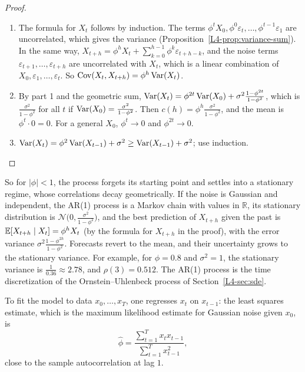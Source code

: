 \begin{proof}
    \begin{enumerate}
        \item The formula for $X_t$ follows by induction. The terms $\phi^tX_0, \phi^0\varepsilon_t, \ldots, \phi^{t-1}\varepsilon_1$ are uncorrelated, which gives the variance (Proposition~\ref{L4-prop:variance-sum}). In the same way, $X_{t+h} = \phi^hX_t + \sum_{k=0}^{h-1}\phi^k\varepsilon_{t+h-k}$, and the noise terms $\varepsilon_{t+1}, \ldots, \varepsilon_{t+h}$ are uncorrelated with $X_t$, which is a linear combination of $X_0, \varepsilon_1, \ldots, \varepsilon_t$. So $\operatorname{Cov}(X_t, X_{t+h}) = \phi^h\operatorname{Var}(X_t)$.
        \item By part 1 and the geometric sum, $\operatorname{Var}(X_t) = \phi^{2t}\operatorname{Var}(X_0) + \sigma^2\frac{1 - \phi^{2t}}{1 - \phi^2}$, which is $\frac{\sigma^2}{1 - \phi^2}$ for all $t$ if $\operatorname{Var}(X_0) = \frac{\sigma^2}{1 - \phi^2}$. Then $c(h) = \phi^h\frac{\sigma^2}{1 - \phi^2}$, and the mean is $\phi^t \cdot 0 = 0$. For a general $X_0$, $\phi^t \to 0$ and $\phi^{2t} \to 0$.
        \item $\operatorname{Var}(X_t) = \phi^2\operatorname{Var}(X_{t-1}) + \sigma^2 \geq \operatorname{Var}(X_{t-1}) + \sigma^2$; use induction. \qedhere
    \end{enumerate}
\end{proof}

So for $|\phi| < 1$, the process forgets its starting point and settles into a stationary regime, whose correlations decay geometrically. If the noise is Gaussian and independent, the AR(1) process is a Markov chain with values in $\mathbb{R}$, its stationary distribution is $\mathcal{N}\big(0, \frac{\sigma^2}{1 - \phi^2}\big)$, and the best prediction of $X_{t+h}$ given the past is $\mathbb{E}[X_{t+h} \mid X_t] = \phi^hX_t$ (by the formula for $X_{t+h}$ in the proof), with the error variance $\sigma^2\frac{1 - \phi^{2h}}{1 - \phi^2}$. Forecasts revert to the mean, and their uncertainty grows to the stationary variance. For example, for $\phi = 0.8$ and $\sigma^2 = 1$, the stationary variance is $\frac{1}{0.36} \approx 2.78$, and $\rho(3) = 0.512$. The AR(1) process is the time discretization of the Ornstein--Uhlenbeck process of Section~\ref{L4-sec:sde}.

To fit the model to data $x_0, \ldots, x_T$, one regresses $x_t$ on $x_{t-1}$: the least squares estimate, which is the maximum likelihood estimate for Gaussian noise given $x_0$, is
\[\hat\phi = \frac{\sum_{t=1}^T x_tx_{t-1}}{\sum_{t=1}^T x_{t-1}^2},\]
close to the sample autocorrelation at lag $1$.

